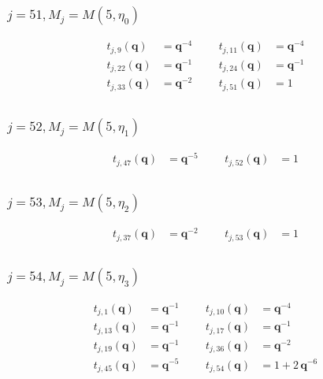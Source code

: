 \subsubsection{$j=51, M_{j}=M(5,\eta_{0})$}
\begin{align*}
t_{j,9}(\boldsymbol{q})&=\boldsymbol{q}^{-4} &&& t_{j,11}(\boldsymbol{q})&=\boldsymbol{q}^{-4} \\
t_{j,22}(\boldsymbol{q})&=\boldsymbol{q}^{-1} &&& t_{j,24}(\boldsymbol{q})&=\boldsymbol{q}^{-1} \\
t_{j,33}(\boldsymbol{q})&=\boldsymbol{q}^{-2} &&& t_{j,51}(\boldsymbol{q})&=1 \\
\end{align*}

\subsubsection{$j=52, M_{j}=M(5,\eta_{1})$}
\begin{align*}
t_{j,47}(\boldsymbol{q})&=\boldsymbol{q}^{-5} &&& t_{j,52}(\boldsymbol{q})&=1 \\
\end{align*}

\subsubsection{$j=53, M_{j}=M(5,\eta_{2})$}
\begin{align*}
t_{j,37}(\boldsymbol{q})&=\boldsymbol{q}^{-2} &&& t_{j,53}(\boldsymbol{q})&=1 \\
\end{align*}

\subsubsection{$j=54, M_{j}=M(5,\eta_{3})$}
\begin{align*}
t_{j,1}(\boldsymbol{q})&=\boldsymbol{q}^{-1} &&& t_{j,10}(\boldsymbol{q})&=\boldsymbol{q}^{-4} \\
t_{j,13}(\boldsymbol{q})&=\boldsymbol{q}^{-1} &&& t_{j,17}(\boldsymbol{q})&=\boldsymbol{q}^{-1} \\
t_{j,19}(\boldsymbol{q})&=\boldsymbol{q}^{-1} &&& t_{j,36}(\boldsymbol{q})&=\boldsymbol{q}^{-2} \\
t_{j,45}(\boldsymbol{q})&=\boldsymbol{q}^{-5} &&& t_{j,54}(\boldsymbol{q})&=1 + 2\,\boldsymbol{q}^{-6} \\
\end{align*}

